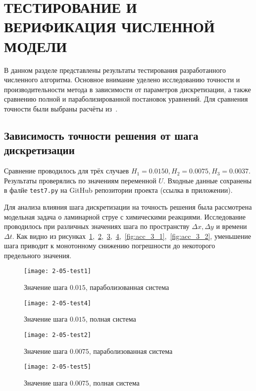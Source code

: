 \section{ТЕСТИРОВАНИЕ И ВЕРИФИКАЦИЯ ЧИСЛЕННОЙ МОДЕЛИ}

В данном разделе представлены результаты тестирования разработанного численного алгоритма. Основное внимание уделено исследованию точности и производительности метода в зависимости от параметров дискретизации, а также сравнению полной и параболизированной постановок уравнений. Для сравнения точности были выбраны расчёты из~\cite{book11_tur}.

\subsection{Зависимость точности решения от шага дискретизации}

Сравнение проводилось для трёх случаев $H_1 = 0.0150, H_2 = 0.0075, H_3 = 0.0037$. Результаты проверялись по значениям переменной $U$. Входные данные сохранены в фалйе \texttt{test7.py} на GitHub репозитории проекта (ссылка в приложении).

Для анализа влияния шага дискретизации на точность решения была рассмотрена модельная задача о ламинарной струе с химическими реакциями. Исследование проводилось при различных значениях шага по пространству $\Delta x, \Delta y$ и времени $\Delta t$. Как видно из рисунках~\ref{fig:acc_1_1},~\ref{fig:acc_1_2},~\ref{fig:acc_2_1},~\ref{fig:acc_2_2},~\ref{fig:acc_3_1},~\ref{fig:acc_3_2}, уменьшение шага приводит к монотонному снижению погрешности до некоторого предельного значения. 

\begin{figure}
    \texttt{[image: 2-05-test1]}
    \caption{Значение шага $0.015$, параболизованная система}
    \label{fig:acc_1_1}
\end{figure}

\begin{figure}
    \texttt{[image: 2-05-test4]}
    \caption{Значение шага $0.015$, полная система}
    \label{fig:acc_1_2}
\end{figure}

\begin{figure}
    \texttt{[image: 2-05-test2]}
    \caption{Значение шага $0.0075$, параболизованная система}
    \label{fig:acc_2_1}
\end{figure}

\begin{figure}
    \texttt{[image: 2-05-test5]}
    \caption{Значение шага $0.0075$, полная система}
    \label{fig:acc_2_2}
\end{figure}

